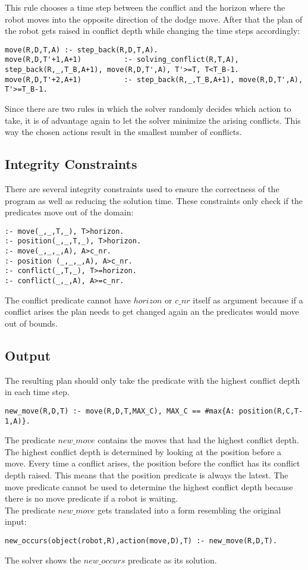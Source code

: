 \documentclass[runningheads]{llncs}
\begin{document}
This rule chooses a time step between the conflict and the horizon where the robot moves into the opposite direction of the dodge move. After that the plan of the robot gets raised in conflict depth while changing the time steps accordingly:
\begin{verbatim}
move(R,D,T,A) :- step_back(R,D,T,A).
move(R,D,T'+1,A+1) 			:- solving_conflict(R,T,A), step_back(R,_,T_B,A+1), move(R,D,T',A), T'>=T, T<T_B-1.
move(R,D,T'+2,A+1) 			:- step_back(R,_,T_B,A+1), move(R,D,T',A), T'>=T_B-1.
\end{verbatim}
Since there are two rules in which the solver randomly decides which action to take, it is of advantage again to let the solver minimize the arising conflicts. This way the chosen actions result in the smallest number of conflicts.

\subsection{Integrity Constraints}
There are several integrity constraints used to ensure the correctness of the program as well as reducing the solution time.
These constraints only check if the predicates move out of the domain:
\begin{verbatim}
:- move(_,_,T,_), T>horizon.
:- position(_,_,T,_), T>horizon.
:- move(_,_,_,A), A>c_nr.
:- position (_,_,_,A), A>c_nr.
:- conflict(_,T,_), T>=horizon.
:- conflict(_,_,A), A>=c_nr.
\end{verbatim}
The conflict predicate cannot have $horizon$ or $c\_nr$ itself as argument because if a conflict arises the plan needs to get changed again an the predicates would move out of bounds.


\subsection{Output}
The resulting plan should only take the predicate with the highest conflict depth in each time step. 
\begin{verbatim}
new_move(R,D,T) :- move(R,D,T,MAX_C), MAX_C == #max{A: position(R,C,T-1,A)}.
\end{verbatim}
The predicate $new\_move$ contains the moves that had the highest conflict depth. The highest conflict depth is determined by looking at the position before a move. Every time a conflict arises, the position before the conflict has its conflict depth raised. This means that the position predicate is always the latest. The move predicate cannot be used to determine the highest conflict depth because there is no move predicate if a robot is waiting. \\
The predicate $new\_move$ gets translated into a form resembling the original input:
\begin{verbatim}
new_occurs(object(robot,R),action(move,D),T) :- new_move(R,D,T).
\end{verbatim}
The solver shows the $new\_occurs$ predicate as its solution.
\end{document}
